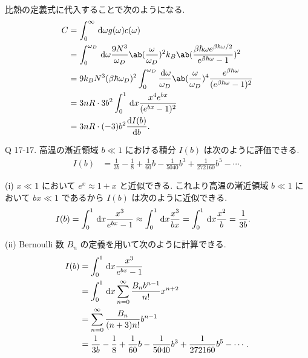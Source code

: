 \documentclass[uplatex,diffipdfmx,a4paper,11pt]{jlreq}
\theoremstyle{definition}
\begin{document}
比熱の定義式に代入することで次のようになる.
\begin{align}
  C & = \int_0^\infty\dl{\omega}g(\omega)c(\omega)                                                                                                                         \\
    & = \int_0^{\omega_D}\dl{\omega}\frac{9N^3}{\omega_D}\ab(\frac{\omega}{\omega_D})^2k_B\ab(\frac{\beta\hbar\omega e^{\beta\hbar\omega/2}}{e^{\beta\hbar\omega} - 1})^2  \\
    & = 9k_BN^3(\beta\hbar\omega_D)^2\int_0^{\omega_D}\frac{\dl{\omega}}{\omega_D}\ab(\frac{\omega}{\omega_D})^4\frac{ e^{\beta\hbar\omega}}{(e^{\beta\hbar\omega} - 1)^2} \\
    & = 3nR\cdot 3b^2\int_0^1\dl{x}\frac{x^4e^{bx}}{(e^{bx} - 1)^2}                                                                                                        \\
    & = 3nR\cdot (-3)b^2\diff{I(b)}{b}.
\end{align}

\begin{itembox}[l]{Q 17-17.}
  高温の漸近領域 $b\ll 1$ における積分 $I(b)$ は次のように評価できる.
  \begin{align}
    I(b) & = \frac{1}{3b} - \frac{1}{8} + \frac{1}{60}b - \frac{1}{5040}b^3 + \frac{1}{272160}b^5 - \cdots.
  \end{align}
\end{itembox}

(i) $x\ll 1$ において $e^x \approx 1 + x$ と近似できる. これより高温の漸近領域 $b\ll 1$ において $bx \ll 1$ であるから $I(b)$ は次のように近似できる.
\begin{align}
  I(b) & = \int_0^1\dl{x}\frac{x^3}{e^{bx} - 1} \approx \int_0^1\dl{x}\frac{x^3}{bx} = \int_0^1\dl{x}\frac{x^2}{b} = \frac{1}{3b}.
\end{align}

(ii) Bernoulli 数 $B_n$ の定義を用いて次のように計算できる.
\begin{align}
  I(b) & = \int_0^1\dl{x}\frac{x^3}{e^{bx} - 1}                                                           \\
       & = \int_0^1\dl{x}\sum_{n=0}^{\infty}\frac{B_n b^{n-1}}{n!}x^{n+2}                                 \\
       & = \sum_{n=0}^{\infty}\frac{B_n}{(n + 3)n!}b^{n-1}                                                \\
       & = \frac{1}{3b} - \frac{1}{8} + \frac{1}{60}b - \frac{1}{5040}b^3 + \frac{1}{272160}b^5 - \cdots.
\end{align}
\end{document}
